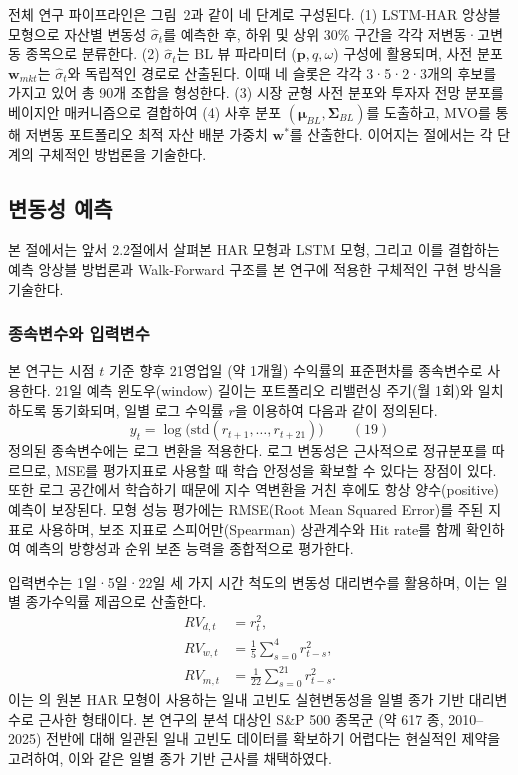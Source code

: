 \documentclass{article}
\begin{document}
전체 연구 파이프라인은 그림~2과 같이 네 단계로 구성된다. (1) LSTM-HAR 앙상블 모형으로 자산별 변동성 $\hat{\sigma}_t$를 예측한 후, 하위 및 상위 30\% 구간을 각각 저변동·고변동 종목으로 분류한다. (2) $\hat{\sigma}_t$는 BL 뷰 파라미터 ($\mathbf{p}, q, \omega$) 구성에 활용되며, 사전 분포 $\mathbf{w}_{mkt}$는 $\hat{\sigma}_t$와 독립적인 경로로 산출된다. 이때 네 슬롯은 각각 3·5·2·3개의 후보를 가지고 있어 총 90개 조합을 형성한다. (3) 시장 균형 사전 분포와 투자자 전망 분포를 베이지안 매커니즘으로 결합하여 (4) 사후 분포 $(\boldsymbol{\mu}_{BL}, \boldsymbol{\Sigma}_{BL})$를 도출하고, MVO를 통해 저변동 포트폴리오 최적 자산 배분 가중치 $\mathbf{w}^*$를 산출한다. 이어지는 절에서는 각 단계의 구체적인 방법론을 기술한다.

\subsection{변동성 예측}\label{subsec:vol_pred}

본 절에서는 앞서 2.2절에서 살펴본 HAR 모형과 LSTM 모형, 그리고 이를 결합하는 예측 앙상블 방법론과 Walk-Forward 구조를 본 연구에 적용한 구체적인 구현 방식을 기술한다.

\subsubsection{종속변수와 입력변수}\label{subsubsec:variable}
본 연구는 시점 $t$ 기준 향후 21영업일 (약 1개월) 수익률의 표준편차를 종속변수로 사용한다. 21일 예측 윈도우(window) 길이는 포트폴리오 리밸런싱 주기(월 1회)와 일치하도록 동기화되며, 일별 로그 수익률 $r$을 이용하여 다음과 같이 정의된다.
\begin{equation}
y_t = \log\bigl(\mathrm{std}(r_{t+1}, \ldots, r_{t+21})\bigr) \qquad(19)\end{equation}
정의된 종속변수에는 로그 변환을 적용한다. 로그 변동성은 근사적으로 정규분포를 따르므로, MSE를 평가지표로 사용할 때 학습 안정성을 확보할 수 있다는 장점이 있다. 또한 로그 공간에서 학습하기 때문에 지수 역변환을 거친 후에도 항상 양수(positive) 예측이 보장된다. 모형 성능 평가에는 RMSE(Root Mean Squared Error)를 주된 지표로 사용하며, 보조 지표로 스피어만(Spearman) 상관계수와 Hit rate를 함께 확인하여 예측의 방향성과 순위 보존 능력을 종합적으로 평가한다.

입력변수는 1일·5일·22일 세 가지 시간 척도의 변동성 대리변수를 활용하며, 이는 일별 종가수익률 제곱으로 산출한다.
\begin{align}
RV_{d,t} &= r_t^2,\\
RV_{w,t} &= \frac{1}{5}\sum_{s=0}^{4} r_{t-s}^2,\\
RV_{m,t} &= \frac{1}{22}\sum_{s=0}^{21} r_{t-s}^2.
\end{align}
이는 \citet{corsi2009}의 원본 HAR 모형이 사용하는 일내 고빈도 실현변동성을 일별 종가 기반 대리변수로 근사한 형태이다. 본 연구의 분석 대상인 S\&P 500 종목군 (약 617 종, 2010--2025) 전반에 대해 일관된 일내 고빈도 데이터를 확보하기 어렵다는 현실적인 제약을 고려하여, 이와 같은 일별 종가 기반 근사를 채택하였다.
\end{document}
